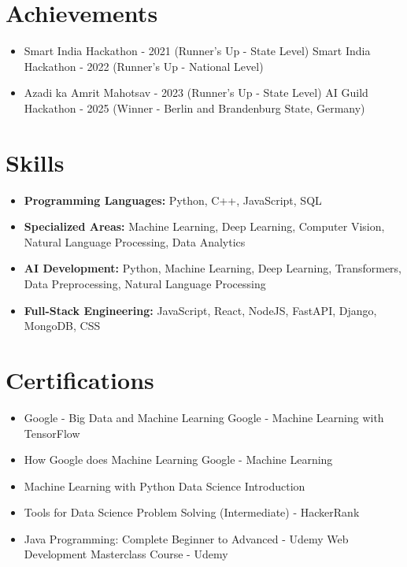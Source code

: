 \documentclass[a4paper,10pt]{article}
\begin{document}
\section*{Achievements}
\begin{itemize}
\item Smart India Hackathon - 2021 (Runner's Up - State Level) \hfill Smart India Hackathon - 2022 (Runner's Up - National Level)
\item Azadi ka Amrit Mahotsav - 2023 (Runner's Up - State Level) \hfill AI Guild Hackathon - 2025 (Winner - Berlin and Brandenburg State, Germany)
\end{itemize}

\section*{Skills}
\begin{itemize}
  \item \textbf{Programming Languages:} Python, C++, JavaScript, SQL
  \item \textbf{Specialized Areas:} Machine Learning, Deep Learning, Computer Vision, Natural Language Processing, Data Analytics
  \item \textbf{AI Development:} Python, Machine Learning, Deep Learning, Transformers, Data Preprocessing, Natural Language Processing
  \item \textbf{Full-Stack Engineering:} JavaScript, React, NodeJS, FastAPI, Django, MongoDB, CSS
\end{itemize}

\section*{Certifications}
\begin{itemize}
\item Google - Big Data and Machine Learning \hfill Google - Machine Learning with TensorFlow
\item How Google does Machine Learning \hfill Google - Machine Learning
\item Machine Learning with Python \hfill Data Science Introduction
\item Tools for Data Science \hfill Problem Solving (Intermediate) - HackerRank
\item Java Programming: Complete Beginner to Advanced - Udemy \hfill Web Development Masterclass Course - Udemy
\end{itemize}
\end{document}
